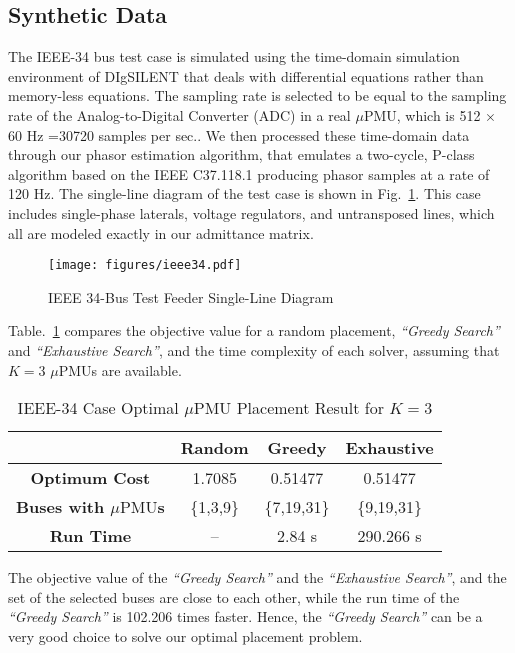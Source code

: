 \documentclass[twocolumn]{IEEEtran}
\newcommand{\mup}{\mu \text{PMU}}
\begin{document}
\subsection{Synthetic Data}
The IEEE-34 bus test case \cite{ieee34} is simulated using the time-domain simulation environment of DIgSILENT \cite{manual2009version} that deals with differential equations rather than memory-less equations. The sampling rate is selected to be equal to the sampling rate of the Analog-to-Digital Converter (ADC) in a real $\mup$, which is 512 $\times$ 60 Hz =30720 samples per sec.. We then processed these time-domain data through our phasor estimation algorithm, that emulates a two-cycle, P-class algorithm based on the IEEE C37.118.1 \cite{c37} producing phasor samples at a rate of 120 Hz. The single-line diagram of the test case is shown in Fig.~\ref{fig.ieee34}. This case includes single-phase laterals, voltage regulators, and untransposed lines, which all are modeled exactly in our admittance matrix.    
\begin{figure}[ht]
\centering 
\texttt{[image: figures/ieee34.pdf]}
\caption{IEEE 34-Bus Test Feeder Single-Line Diagram}
\label{fig.ieee34}
\end{figure}

Table.~\ref{tab.opt} compares the objective value for a random placement, \textit{``Greedy Search''} and \textit{``Exhaustive Search''}, and the time complexity of each solver, assuming that $K=3$ $\mup$s are available. 
\begin{table}[htbp]
\caption{IEEE-34 Case Optimal $\mup$ Placement Result for $K=3$}
\label{tab.opt}
\begin{center}
\begin{tabular}{|c|c|c|c|}
\hline
& \bf{Random} & \bf{Greedy} & \bf{Exhaustive}\\
\hline \hline
\bf{Optimum Cost} & 1.7085 &0.51477&0.51477 \\ \hline
\bf{Buses with $\mup$s} &\{1,3,9\} &\{7,19,31\}&\{9,19,31\}\\ \hline 
\bf{Run Time} & --&2.84 s&290.266 s\\ \hline 
\end{tabular}
\end{center}
\end{table}     
The objective value of the \textit{``Greedy Search''} and the \textit{``Exhaustive Search''}, and the set of the selected buses are close to each other, while the run time of the \textit{``Greedy Search''} is 102.206 times faster. Hence, the \textit{``Greedy Search''} can be a very good choice to solve our optimal placement problem.         
\end{document}
